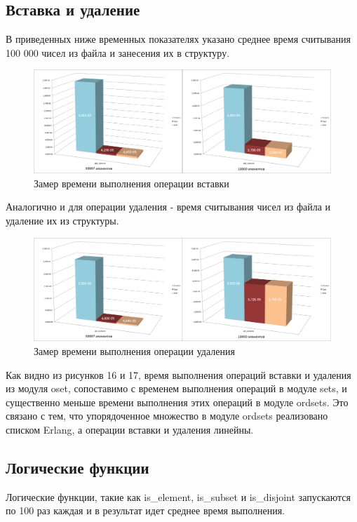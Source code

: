 	\subsection{Вставка и удаление}
		В приведенных ниже временных показателях указано среднее время считывания 100 000 чисел из файла и занесения 
		их в структуру.
		
		\begin{figure}[H]
				\centering
				\includegraphics[width=\textwidth]{img/histograms/add_element.png}
				\caption{Замер времени выполнения операции вставки}
		\end{figure}
		
		Аналогично и для операции удаления - время считывания чисел из файла и удаление их из структуры. 
		
		\begin{figure}[H]
				\centering
				\includegraphics[width=\textwidth]{img/histograms/del_element.png}
				\caption{Замер времени выполнения операции удаления}
		\end{figure}
		
		Как видно из рисунков 16 и 17, время выполнения операций вставки и удаления из модуля oset, сопоставимо 
		с временем выполнения операций в модуле sets, и существенно меньше времени выполнения этих операций
		в модуле ordsets. Это связано с тем, что упорядоченное множество в модуле ordsets реализовано 
		списком Erlang, а операции вставки и удаления линейны. 	
		
	\subsection{Логические функции}
		Логические функции, такие как is\_element, is\_subset и is\_disjoint запускаются по 100 раз
		каждая и в результат идет среднее время выполнения.
		
